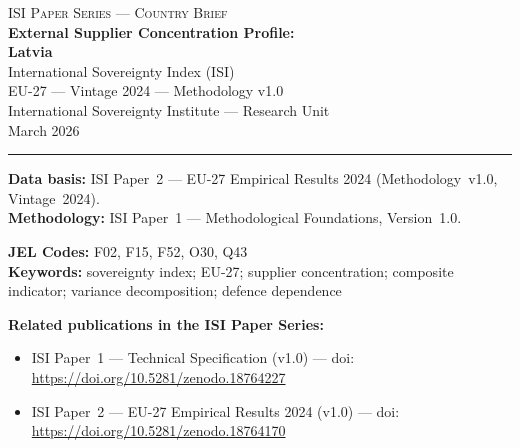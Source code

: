 \documentclass[12pt,a4paper]{article}
\begin{document}
\hypersetup{pageanchor=false}

\begin{titlepage}
\centering
\vspace*{2cm}
{\Large\textsc{ISI Paper Series --- Country Brief}}\\[1.2cm]
{\LARGE\bfseries External Supplier Concentration Profile:\\[0.3em]
Latvia}\\[1.5cm]
{\large International Sovereignty Index (ISI)\\[0.3em]
EU-27 --- Vintage 2024 --- Methodology v1.0}\\[1.2cm]
{\large International Sovereignty Institute --- Research Unit}\\[0.8cm]
{\large March 2026}

\vspace{0.8cm}
\noindent\rule{\textwidth}{0.4pt}
\vspace{0.4cm}

\begin{flushleft}
\noindent\textbf{Data basis:} ISI Paper~2 --- EU-27 Empirical Results 2024 (Methodology~v1.0, Vintage~2024).\\[4pt]
\noindent\textbf{Methodology:} ISI Paper~1 --- Methodological Foundations, Version~1.0.

\medskip

\noindent\textbf{JEL Codes:} F02, F15, F52, O30, Q43\\[4pt]
\noindent\textbf{Keywords:} sovereignty index; EU-27; supplier concentration; composite indicator; variance decomposition; defence dependence

\medskip

\noindent\textbf{Related publications in the ISI Paper Series:}
\begin{itemize}[nosep,leftmargin=1.5em]
\item ISI Paper~1 --- Technical Specification (v1.0) --- doi:\\
  \url{https://doi.org/10.5281/zenodo.18764227}
\item ISI Paper~2 --- EU-27 Empirical Results 2024 (v1.0) --- doi:\\
  \url{https://doi.org/10.5281/zenodo.18764170}
\end{itemize}
\end{flushleft}
\vfill
\end{titlepage}
\end{document}
